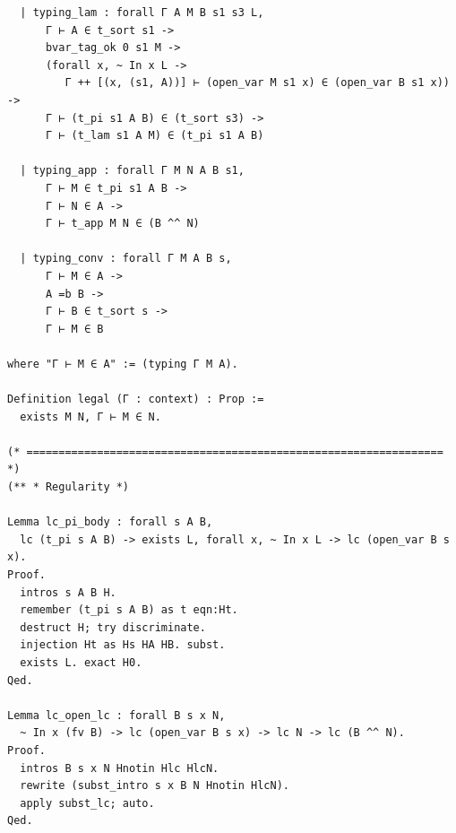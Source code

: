 \begin{latin}
\begin{verbatim}
  | typing_lam : forall Γ A M B s1 s3 L,
      Γ ⊢ A ∈ t_sort s1 ->
      bvar_tag_ok 0 s1 M ->
      (forall x, ~ In x L ->
         Γ ++ [(x, (s1, A))] ⊢ (open_var M s1 x) ∈ (open_var B s1 x)) ->
      Γ ⊢ (t_pi s1 A B) ∈ (t_sort s3) ->
      Γ ⊢ (t_lam s1 A M) ∈ (t_pi s1 A B)

  | typing_app : forall Γ M N A B s1,
      Γ ⊢ M ∈ t_pi s1 A B ->
      Γ ⊢ N ∈ A ->
      Γ ⊢ t_app M N ∈ (B ^^ N)

  | typing_conv : forall Γ M A B s,
      Γ ⊢ M ∈ A ->
      A =b B ->
      Γ ⊢ B ∈ t_sort s ->
      Γ ⊢ M ∈ B

where "Γ ⊢ M ∈ A" := (typing Γ M A).

Definition legal (Γ : context) : Prop :=
  exists M N, Γ ⊢ M ∈ N.

(* ================================================================= *)
(** * Regularity *)

Lemma lc_pi_body : forall s A B,
  lc (t_pi s A B) -> exists L, forall x, ~ In x L -> lc (open_var B s x).
Proof.
  intros s A B H.
  remember (t_pi s A B) as t eqn:Ht.
  destruct H; try discriminate.
  injection Ht as Hs HA HB. subst.
  exists L. exact H0.
Qed.

Lemma lc_open_lc : forall B s x N,
  ~ In x (fv B) -> lc (open_var B s x) -> lc N -> lc (B ^^ N).
Proof.
  intros B s x N Hnotin Hlc HlcN.
  rewrite (subst_intro s x B N Hnotin HlcN).
  apply subst_lc; auto.
Qed.


\end{verbatim}
\end{latin}
